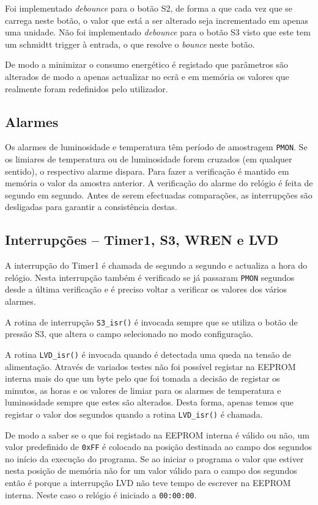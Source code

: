 \documentclass[a4paper,12pt]{article}
\begin{document}
Foi implementado \textit{debounce} para o botão S2, de forma a que cada vez que se carrega neste botão, o valor que está a ser alterado seja incrementado em apenas uma unidade. Não foi implementado \textit{debounce} para o botão S3 visto que este tem um schmidtt trigger à entrada, o que resolve o \textit{bounce} neste botão.

De modo a minimizar o consumo energético é registado que parâmetros são alterados de modo a apenas actualizar no ecrã e em memória os valores que realmente foram redefinidos pelo utilizador.

\subsection{Alarmes}

Os alarmes de luminosidade e temperatura têm período de amostragem \texttt{PMON}. Se os limiares de temperatura ou de luminosidade forem cruzados (em qualquer sentido), o respectivo alarme dispara. Para fazer a verificação é mantido em memória o valor da amostra anterior.
A verificação do alarme do relógio é feita de segundo em segundo. Antes de serem efectuadas comparações, as interrupções são desligadas para garantir a consistência destas.

\subsection{Interrupções -- Timer1, S3, WREN e LVD}

A interrupção do Timer1 é chamada de segundo a segundo e actualiza a hora do relógio. Nesta interrupção também é verificado se já passaram \texttt{PMON} segundos desde a última verificação e é preciso voltar a verificar os valores dos vários alarmes.

A rotina de interrupção \texttt{S3\_isr()} é invocada sempre que se utiliza o botão de pressão S3, que altera o campo selecionado no modo configuração.

A rotina \texttt{LVD\_isr()} é invocada quando é detectada uma queda na tensão de alimentação. Através de variados testes não foi possível registar na EEPROM interna mais do que um byte pelo que foi tomada a decisão de registar os minutos, as horas e os valores de limiar para os alarmes de temperatura e luminosidade sempre que estes são alterados. Desta forma, apenas temos que registar o valor dos segundos quando a rotina \texttt{LVD\_isr()} é chamada.

De modo a saber se o que foi registado na EEPROM interna é válido ou não, um valor predefinido de \texttt{0xFF} é colocado na posição destinada ao campo dos segundos no início da execução do programa. Se ao iniciar o programa o valor que estiver nesta posição de memória não for um valor válido para o campo dos segundos então é porque a interrupção LVD não teve tempo de escrever na EEPROM interna. Neste caso o relógio é iniciado a \texttt{00:00:00}.
\end{document}

